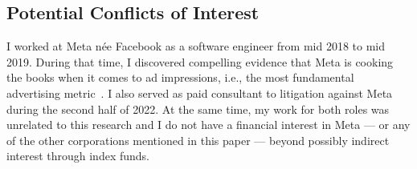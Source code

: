 \subsection{Potential Conflicts of Interest}

I worked at Meta n\'ee Facebook as a software engineer from mid 2018 to mid
2019. During that time, I discovered compelling evidence that Meta is cooking
the books when it comes to ad impressions, i.e., the most fundamental
advertising metric~. I also served as paid
consultant to litigation against Meta during the second half of 2022. At the
same time, my work for both roles was unrelated to this research and I do not
have a financial interest in Meta --- or any of the other corporations mentioned
in this paper --- beyond possibly indirect interest through index funds.
